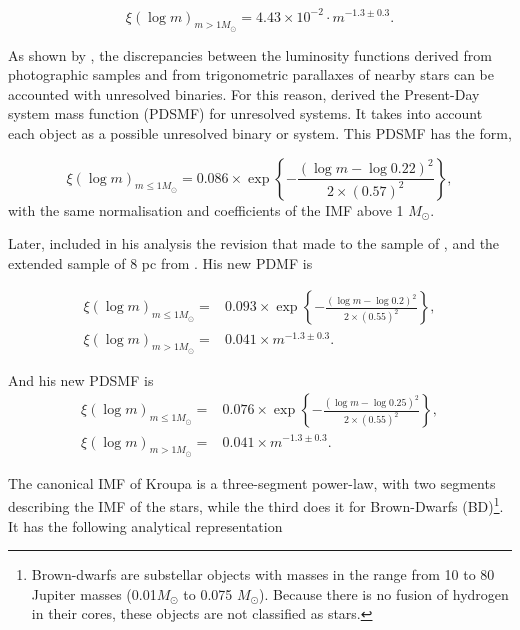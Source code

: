 \begin{equation}
\xi(\log m)_{m>1M_{\odot}}= 4.43\times10^{-2}\cdot m^{-1.3\pm0.3}.\nonumber
\end{equation}

As shown by \citet{1991MNRAS.251..293K}, the discrepancies between the luminosity functions derived from photographic samples and from trigonometric parallaxes of nearby stars can be accounted with unresolved binaries. For this reason, \citet{Chabrier2003a} derived the Present-Day system mass function (PDSMF) for unresolved systems. It takes into account each object as a possible unresolved binary or system. This PDSMF has the form,

\begin{equation}
\xi(\log m)_{m\leq1M_{\odot}}=0.086\times \exp{\left\{-\frac{(\log m - \log 0.22)^2}{2 \times (0.57)^2}\right\}},\nonumber
\end{equation}
with the same normalisation and coefficients of the IMF above 1 $M_{\odot}$.

Later, \citet{Chabrier2005} included in his analysis the revision that \citet{2002AJ....124.2721R} made to the sample of \citep{1986AJ.....91..621D}, and the extended sample of 8 pc from \citet{2004AJ....128..463R}. His new PDMF is

 \begin{align}
\xi(\log m)_{m\leq1M_{\odot}}=&0.093\times \exp{\left\{-\frac{(\log m - \log 0.2)^2}{2 \times (0.55)^2}\right\}},\nonumber\\
\xi(\log m)_{m>1M_{\odot}}=& 0.041\times m^{-1.3\pm0.3}.\nonumber
\end{align}

And his new PDSMF is
 \begin{align}
\xi(\log m)_{m\leq1M_{\odot}}=&0.076\times \exp{\left\{-\frac{(\log m - \log 0.25)^2}{2 \times (0.55)^2}\right\}},\nonumber\\
\xi(\log m)_{m>1M_{\odot}}=& 0.041\times m^{-1.3\pm0.3}.
\end{align}

The canonical IMF of Kroupa \citep{2013pss5.book..115K} is a three-segment power-law, with two segments describing the IMF of the stars, while the third does it for Brown-Dwarfs (BD)\footnote{Brown-dwarfs are substellar objects with masses in the range from 10 to 80 Jupiter masses (0.01$M_{\odot}$ to 0.075 $M_{\odot}$). Because there is no fusion of hydrogen in their cores, these objects are not classified as stars.}. It has the following analytical representation


